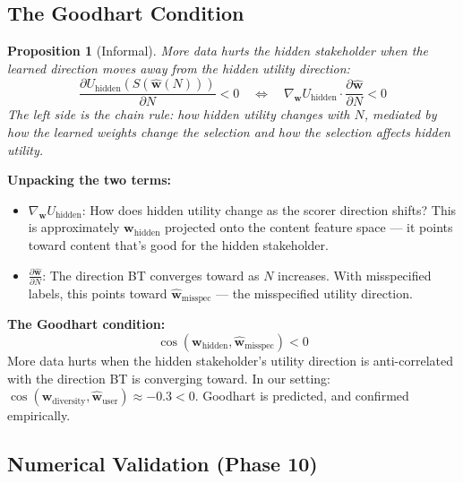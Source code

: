 \documentclass[11pt]{article}
\newtheorem{proposition}{Proposition}
\begin{document}
\subsection{The Goodhart Condition}

\begin{proposition}[Informal]
More data hurts the hidden stakeholder when the learned direction
moves \emph{away} from the hidden utility direction:
\begin{equation}
  \frac{\partial U_{\text{hidden}}(S(\hat{\mathbf{w}}(N)))}{\partial N} < 0
  \quad \Longleftrightarrow \quad
  \nabla_{\mathbf{w}} U_{\text{hidden}} \cdot
  \frac{\partial \hat{\mathbf{w}}}{\partial N} < 0
\end{equation}
The left side is the chain rule: how hidden utility changes with $N$,
mediated by how the learned weights change the selection and how the
selection affects hidden utility.
\end{proposition}

\textbf{Unpacking the two terms:}

\begin{itemize}
  \item $\nabla_{\mathbf{w}} U_{\text{hidden}}$: How does hidden utility
    change as the scorer direction shifts? This is approximately
    $\mathbf{w}_{\text{hidden}}$ projected onto the content feature
    space --- it points toward content that's good for the hidden
    stakeholder.

  \item $\frac{\partial \hat{\mathbf{w}}}{\partial N}$: The direction
    BT converges toward as $N$ increases. With misspecified labels, this
    points toward $\hat{\mathbf{w}}_{\text{misspec}}$ --- the
    misspecified utility direction.
\end{itemize}

\textbf{The Goodhart condition:}
\begin{equation}
  \cos(\mathbf{w}_{\text{hidden}}, \hat{\mathbf{w}}_{\text{misspec}}) < 0
\end{equation}
More data hurts when the hidden stakeholder's utility direction is
anti-correlated with the direction BT is converging toward. In our
setting: $\cos(\mathbf{w}_{\text{diversity}},
\hat{\mathbf{w}}_{\text{user}}) \approx -0.3 < 0$. Goodhart is
predicted, and confirmed empirically.

\subsection{Numerical Validation (Phase 10)}
\end{document}
